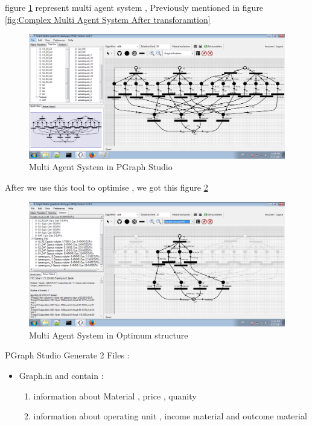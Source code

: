 figure \ref{fig:Multi Agent System in PGraph Studio} represent multi agent system , Previously mentioned in figure \ref{fig:Complex Multi Agent System After transforamtion} 
\begin{figure}[th]
	\centering
		\includegraphics[scale=0.44]{Chapiter3/img/pgraphArt}
	\caption{\label{fig:Multi Agent System in PGraph Studio}Multi Agent System in PGraph Studio}
\end{figure} 
\pagebreak
After we use this tool to optimise , we got this figure \ref{fig:Multi Agent System in Optimum structure}

\begin{figure}[th]
	\centering
		\includegraphics[scale=0.44]{Chapiter3/img/pgraphSol}
	\caption{\label{fig:Multi Agent System in Optimum structure}Multi Agent System in Optimum structure}
\end{figure} 

PGraph Studio Generate 2 Files : 
\begin{itemize}
	\item Graph.in and contain :
		\begin{enumerate}
			\item information about Material , price , quanity
			\item information about operating unit , income material and outcome material 
 	\end{enumerate}

\end{itemize}

